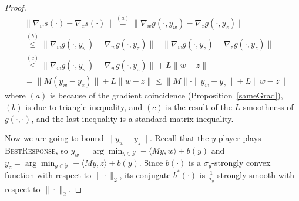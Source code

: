 \documentclass[pmlr]{jmlr} %
\def\BR{\textsc{BestResponse}\xspace}
\newcommand{\yx}[1]{y_{#1}}
\newcommand{\YY}{\mathcal{Y}}
\begin{document}
\begin{proof}

\begin{equation} \label{aux:h}
\begin{aligned}
& \| \nabla_{w} s(\cdot) - \nabla_{z} s(\cdot )\| 
\overset{(a)}{=} \|  \nabla_{w} g( \cdot, \yx{w}) - \nabla_{z} g( \cdot, \yx{z})  \| 
\\ & \overset{(b)}{\leq}
\|  \nabla_{w} g( \cdot, \yx{w}) - \nabla_{w} g( \cdot, \yx{z})  \| 
+ 
\|  \nabla_{w} g( \cdot, \yx{z}) - \nabla_{z} g( \cdot, \yx{z})  \|  
\\ & \overset{(c)}{\leq}
\|  \nabla_{w} g( \cdot, \yx{w}) - \nabla_{w} g( \cdot, \yx{z})  \| 
+ 
L \| w - z \| 
\\ & =
 \| M( \yx{w}  - \yx{z} ) \| 
+ 
L \| w - z \|
\leq \| M \|\cdot \| \yx{w}  - \yx{z}  \| + L \| w - z \|
\end{aligned}
\end{equation}
where $(a)$ is because of the gradient coincidence (Proposition~\ref{sameGrad}),
$(b)$ is due to triangle inequality, and $(c)$ is the result of the $L$-smoothness of $g(\cdot,\cdot)$,
and the last inequality is a standard matrix inequality.

Now we are going to bound 
$ \| \yx{w} - \yx{z} \|.$ 
Recall that the $y$-player plays \BR, so
$\yx{w} = \arg\min_{y \in \YY} - \langle M y, w \rangle + b(y)$ 
and $\yx{z} = \arg\min_{y \in \YY} - \langle M y, z \rangle + b(y)$.
Since $b(\cdot)$ is a $\sigma_{y}$-strongly convex function with respect to $\| \cdot\|_{2}$,
its conjugate $b^{*}(\cdot)$ is $\frac{1}{\sigma_{y}}$-strongly smooth with respect to $\| \cdot \|_{2}$.


\end{proof}
\end{document}
